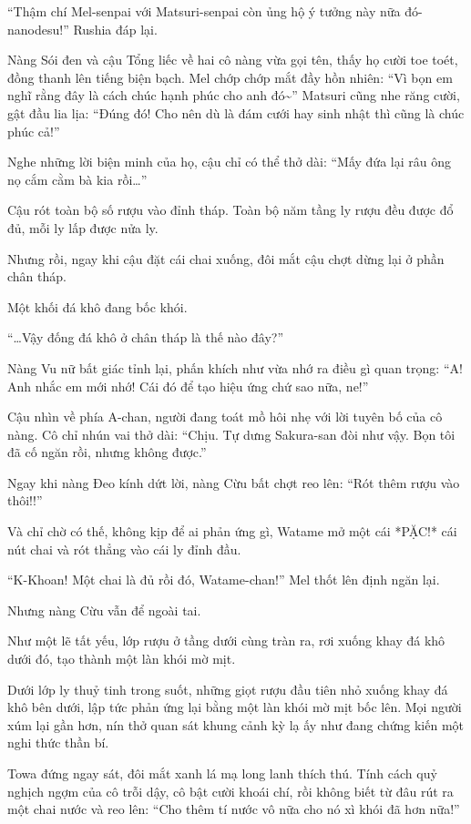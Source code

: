 \documentclass[../main.tex]{subfiles}
\begin{document}
``Thậm chí Mel-senpai với Matsuri-senpai còn ủng hộ ý tưởng này nữa đó-nanodesu!'' Rushia đáp lại.

Nàng Sói đen và cậu Tổng liếc về hai cô nàng vừa gọi tên, thấy họ cười toe toét, đồng thanh lên tiếng biện bạch. Mel chớp chớp mắt đầy hồn nhiên: ``Vì bọn em nghĩ rằng đây là cách chúc hạnh phúc cho anh đó\~{}'' Matsuri cũng nhe răng cười, gật đầu lia lịa: ``Đúng đó! Cho nên dù là đám cưới hay sinh nhật thì cũng là chúc phúc cả!''

Nghe những lời biện minh của họ, cậu chỉ có thể thở dài: ``Mấy đứa lại râu ông nọ cắm cằm bà kia rồi\dots''

Cậu rót toàn bộ số rượu vào đỉnh tháp. Toàn bộ năm tầng ly rượu đều được đổ đủ, mỗi ly lấp được nửa ly.

Nhưng rồi, ngay khi cậu đặt cái chai xuống, đôi mắt cậu chợt dừng lại ở phần chân tháp.

Một khối đá khô đang bốc khói.

``\dots Vậy đống đá khô ở chân tháp là thế nào đây?''

Nàng Vu nữ bất giác tỉnh lại, phấn khích như vừa nhớ ra điều gì quan trọng: ``A! Anh nhắc em mới nhớ! Cái đó để tạo hiệu ứng chứ sao nữa, ne!''

Cậu nhìn về phía A-chan, người đang toát mồ hôi nhẹ với lời tuyên bố của cô nàng. Cô chỉ nhún vai thở dài: ``Chịu. Tự dưng Sakura-san đòi như vậy. Bọn tôi đã cố ngăn rồi, nhưng không được.''

Ngay khi nàng Đeo kính dứt lời, nàng Cừu bất chợt reo lên: ``Rót thêm rượu vào thôi!!''

Và chỉ chờ có thế, không kịp để ai phản ứng gì, Watame mở một cái *PẶC!* cái nút chai và rót thẳng vào cái ly đỉnh đầu.

``K-Khoan! Một chai là đủ rồi đó, Watame-chan!'' Mel thốt lên định ngăn lại.

Nhưng nàng Cừu vẫn để ngoài tai.

Như một lẽ tất yếu, lớp rượu ở tầng dưới cùng tràn ra, rơi xuống khay đá khô dưới đó, tạo thành một làn khói mờ mịt.

Dưới lớp ly thuỷ tinh trong suốt, những giọt rượu đầu tiên nhỏ xuống khay đá khô bên dưới, lập tức phản ứng lại bằng một làn khói mờ mịt bốc lên. Mọi người xúm lại gần hơn, nín thở quan sát khung cảnh kỳ lạ ấy như đang chứng kiến một nghi thức thần bí.

Towa đứng ngay sát, đôi mắt xanh lá mạ long lanh thích thú. Tính cách quỷ nghịch ngợm của cô trỗi dậy, cô bật cười khoái chí, rồi không biết từ đâu rút ra một chai nước và reo lên: ``Cho thêm tí nước vô nữa cho nó xì khói đã hơn nữa!''
\end{document}
